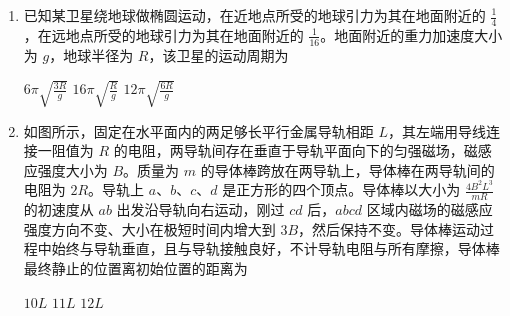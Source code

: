 \documentclass[\gkver]{gaokaozhenti}
\begin{document}
\begin{enumerate}
{联立解得 $ k = \frac{\sqrt{3}mg}{3R} $。

故选 $ C $。
}
\item
已知某卫星绕地球做椭圆运动，在近地点所受的地球引力为其在地面附近的 $ \frac{1}{4} $，在远地点所受的地球引力为其在地面附近的 $ \frac{1}{16} $。地面附近的重力加速度大小为 $ g $，地球半径为 $ R $，该卫星的运动周期为 


{$ 6 \pi\sqrt {\frac{{3R}}{g}} $}
{$ 16 \pi\sqrt {\frac{{R}}{g}} $}
{$ 12 \pi\sqrt {\frac{{6R}}{g}} $}


\item
如图所示，固定在水平面内的两足够长平行金属导轨相距 $ L $，其左端用导线连接一阻值为 $ R $ 的电阻，两导轨间存在垂直于导轨平面向下的匀强磁场，磁感应强度大小为 $ B $。质量为 $ m $ 的导体棒跨放在两导轨上，导体棒在两导轨间的电阻为 $ 2 R $。导轨上 $ a $、$ b $、$ c $、$ d $ 是正方形的四个顶点。导体棒以大小为 $ \frac{{4{B^2}{L^3}}}{{mR}} $ 的初速度从 $ ab $ 出发沿导轨向右运动，刚过 $ cd $ 后，$ abcd $ 区域内磁场的磁感应强度方向不变、大小在极短时间内增大到 $ 3 B $，然后保持不变。导体棒运动过程中始终与导轨垂直，且与导轨接触良好，不计导轨电阻与所有摩擦，导体棒最终静止的位置离初始位置的距离为 
\onepicture[w=5.80cm, h=3.48cm]{}

{$ 10 L $}
{$ 11 L $}
{$ 12 L $}


\end{enumerate}
\end{document}
